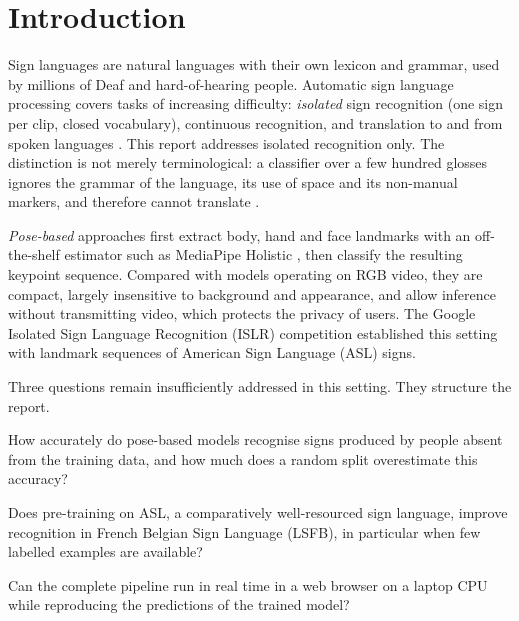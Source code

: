 \section{Introduction}
\label{sec:intro}

Sign languages are natural languages with their own lexicon and grammar, used by millions of Deaf
and hard-of-hearing people. Automatic sign language processing covers tasks of increasing
difficulty: \emph{isolated} sign recognition (one sign per clip, closed vocabulary), continuous
recognition, and translation to and from spoken languages
\citep{bragg2019interdisciplinary,koller2020survey,yin2021including}. This report addresses
isolated recognition only. The distinction is not merely terminological: a classifier over a few
hundred glosses ignores the grammar of the language, its use of space and its non-manual markers,
and therefore cannot translate \citep{yin2021including}.

\emph{Pose-based} approaches first extract body, hand and face landmarks with an off-the-shelf
estimator such as MediaPipe Holistic
\citep{lugaresi2019mediapipe,bazarevsky2020blazepose,zhang2020mediapipehands,kartynnik2019facemesh},
then classify the resulting keypoint sequence. Compared with models operating on RGB video, they
are compact, largely insensitive to background and appearance, and allow inference without
transmitting video, which protects the privacy of users. The Google Isolated Sign Language
Recognition (ISLR) competition \citep{kaggle_islr} established this setting with
\numAslSamples{} landmark sequences of \numAslClasses{} American Sign Language (ASL) signs.

Three questions remain insufficiently addressed in this setting. They structure the report.
\begin{description}[leftmargin=1.2em,labelindent=0pt]
  \item[RQ1 Generalisation.] How accurately do pose-based models recognise signs produced by
        people absent from the training data, and how much does a random split overestimate this
        accuracy?
  \item[RQ2 Transfer.] Does pre-training on ASL, a comparatively well-resourced sign language,
        improve recognition in French Belgian Sign Language (LSFB), in particular when few
        labelled examples are available?
  \item[RQ3 Deployment.] Can the complete pipeline run in real time in a web browser on a laptop
        CPU while reproducing the predictions of the trained model?
\end{description}

